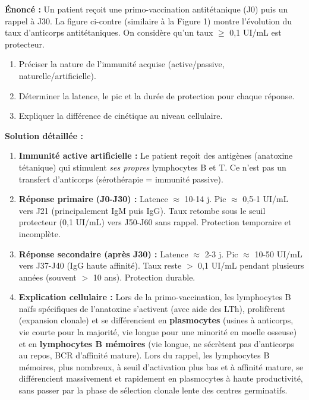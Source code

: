 \documentclass[11pt]{article}
\begin{document}
\begin{exoresolu}
\textbf{Énoncé :} Un patient reçoit une primo-vaccination antitétanique (J0) puis un rappel à J30. La figure ci-contre (similaire à la Figure 1) montre l'évolution du taux d'anticorps antitétaniques. On considère qu'un taux $\ge$ 0,1 UI/mL est protecteur.
\begin{enumerate}
    \item Préciser la nature de l'immunité acquise (active/passive, naturelle/artificielle).
    \item Déterminer la latence, le pic et la durée de protection pour chaque réponse.
    \item Expliquer la différence de cinétique au niveau cellulaire.
\end{enumerate}
\textbf{Solution détaillée :}
\begin{enumerate}
    \item \textbf{Immunité active artificielle :} Le patient reçoit des antigènes (anatoxine tétanique) qui stimulent \emph{ses propres} lymphocytes B et T. Ce n'est pas un transfert d'anticorps (sérothérapie = immunité passive).
    \item \textbf{Réponse primaire (J0-J30) :} Latence $\approx$ 10-14 j. Pic $\approx$ 0,5-1 UI/mL vers J21 (principalement IgM puis IgG). Taux retombe sous le seuil protecteur (0,1 UI/mL) vers J50-J60 sans rappel. Protection temporaire et incomplète.
    \item \textbf{Réponse secondaire (après J30) :} Latence $\approx$ 2-3 j. Pic $\approx$ 10-50 UI/mL vers J37-J40 (IgG haute affinité). Taux reste $>$ 0,1 UI/mL pendant plusieurs années (souvent $>$ 10 ans). Protection durable.
    \item \textbf{Explication cellulaire :} Lors de la primo-vaccination, les lymphocytes B naïfs spécifiques de l'anatoxine s'activent (avec aide des LTh), prolifèrent (expansion clonale) et se différencient en \textbf{plasmocytes} (usines à anticorps, vie courte pour la majorité, vie longue pour une minorité en moelle osseuse) et en \textbf{lymphocytes B mémoires} (vie longue, ne sécrètent pas d'anticorps au repos, BCR d'affinité mature). Lors du rappel, les lymphocytes B mémoires, plus nombreux, à seuil d'activation plus bas et à affinité mature, se différencient massivement et rapidement en plasmocytes à haute productivité, sans passer par la phase de sélection clonale lente des centres germinatifs.
\end{enumerate}
\end{exoresolu}
\end{document}
